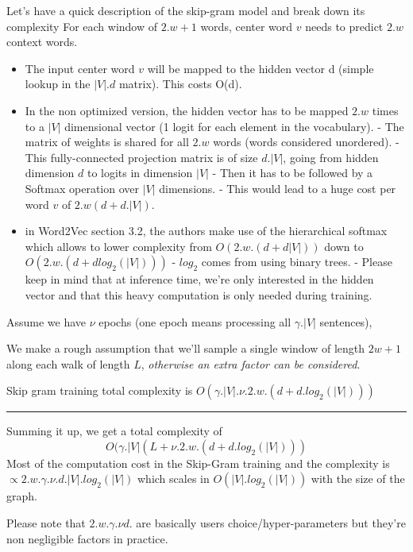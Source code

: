 \documentclass[a4paper]{article}
\begin{document}
Let's have a quick description of the skip-gram model and break down its complexity
For each window of $2.w+1$ words, center word $v$ needs to predict $2.w$ context words.
\begin{itemize}
    \item The input center word $v$ will be mapped to the hidden vector {d} (simple lookup in the $|V|.d$ matrix). This costs {O(d)}.
    \item In the non optimized version, the hidden vector has to be mapped $2.w$ times to a $|V|$ dimensional vector (1 logit for each element in the vocabulary).
        \subitem - The matrix of weights is shared for all $2.w$ words (words considered unordered).
        \subitem - This fully-connected projection matrix is of size $d.|V|$, going from hidden dimension $d$ to logits in dimension $|V|$  
        \subitem - Then it has to be followed by a Softmax operation over $|V|$ dimensions.
        \subitem - This would lead to a huge cost per word $v$ of $2.w(d+d.|V|)$.
    \item in Word2Vec \cite{mikolov2013efficient} section 3.2, the authors make use of the hierarchical softmax which allows
    to lower complexity from $O(2.w.(d+ d|V|))$ down to $O(2.w.(d+ d log_{2}(|V|)))$ 
        \subitem - $log_{2}$ comes from using binary trees.
        \subitem - Please keep in mind that at inference time, we're only interested in the hidden vector and that this heavy computation is only needed during training.
\end{itemize}

Assume we have $\nu$ epochs (one epoch means processing all $\gamma.|V|$ sentences),

We make a rough assumption that we'll sample a single window of length $2w+1$ along each
walk of length $L$, \textit{otherwise an extra factor can be considered}. 

Skip gram training total complexity is $O(\gamma.|V|. \nu. 2.w.(d + d.log_{2}(|V|)))$

\hrule

Summing it up, we get a total complexity of
$$O(\gamma.|V| (L + \nu. 2.w.(d + d.log_{2}(|V|)))$$
Most of the computation cost in the Skip-Gram training and the complexity is $\propto 2.w.\gamma.\nu . d.|V|.log_{2}(|V|)$ which scales in $O(|V|.log_{2}(|V|))$ with the size of the graph.

Please note that $2.w.\gamma.\nu d.$ are basically users choice/hyper-parameters but they're non negligible factors in practice.
\end{document}
